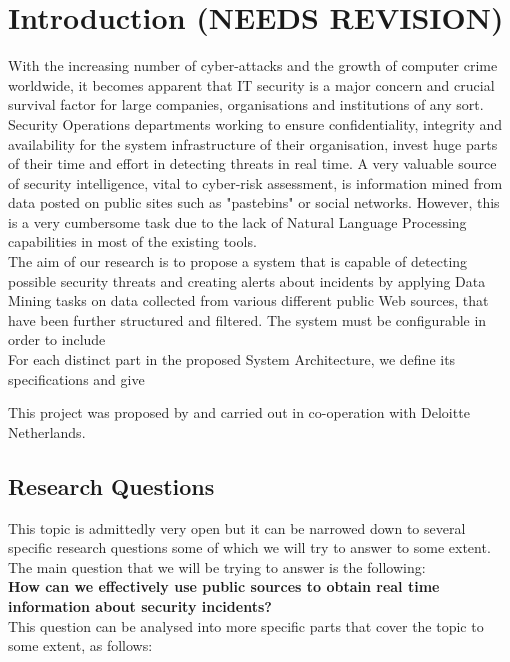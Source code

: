 \documentclass[12pt]{article}
\begin{document}
\newpage

\tableofcontents
\newpage

\section{Introduction (NEEDS REVISION)}
\parbox{\linewidth}{
With the increasing number of cyber-attacks and the growth of computer crime worldwide, it becomes apparent that IT security is a major concern and crucial survival factor for large companies, organisations and institutions of any sort. Security Operations departments working to ensure confidentiality, integrity and availability for the system infrastructure of their organisation, invest huge  parts \cite{cyber} of their time and effort in detecting threats in real time. A very valuable source of security intelligence, vital to cyber-risk assessment, is information mined from data posted on public sites such as "pastebins" or social networks. However, this is a very cumbersome task due to the lack of Natural Language Processing capabilities in most of the existing tools.\hfill \break \\
The aim of our research is to propose a system that is capable of detecting possible security threats and creating alerts about incidents by applying Data Mining tasks on data collected from various different public Web sources, that have been further structured and filtered. The system must be configurable in order to include \hfill \break \\
For each distinct part in the proposed System Architecture, we define its specifications and give 

This project was proposed by and carried out in co-operation with Deloitte Netherlands. 
}
\newpage
\subsection{Research Questions}
This topic is admittedly very open but it can be narrowed down to several specific research questions some of which we will try to answer to some extent. The main question that we will be trying to answer is the following:\\[0.1cm]

\noindent
\textbf{How can we effectively use public sources to obtain real time information about security incidents?}\\[0.1cm]

\noindent
This question can be analysed into more specific parts that cover the topic to some extent, as follows:
\end{document}
